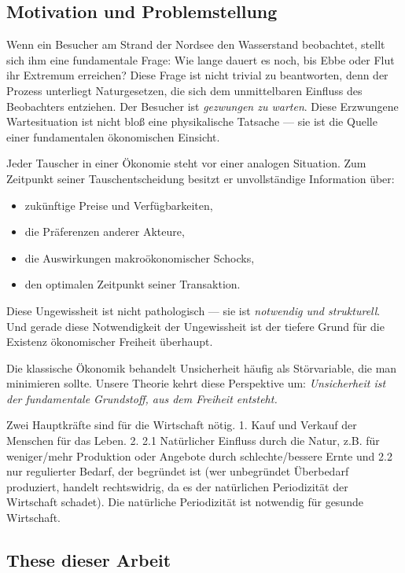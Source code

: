 \documentclass[a4paper, 12pt, twoside, openright]{report}
\theoremstyle{definition}
\theoremstyle{definition}
\begin{document}
\subsection{Motivation und Problemstellung}

Wenn ein Besucher am Strand der Nordsee den Wasserstand beobachtet, stellt sich ihm eine fundamentale Frage: Wie lange dauert es noch, bis Ebbe oder Flut ihr Extremum erreichen? Diese Frage ist nicht trivial zu beantworten, denn der Prozess unterliegt Naturgesetzen, die sich dem unmittelbaren Einfluss des Beobachters entziehen. Der Besucher ist \emph{gezwungen zu warten}. Diese Erzwungene Wartesituation ist nicht bloß eine physikalische Tatsache --- sie ist die Quelle einer fundamentalen ökonomischen Einsicht.

Jeder Tauscher in einer Ökonomie steht vor einer analogen Situation. Zum Zeitpunkt seiner Tauschentscheidung besitzt er unvollständige Information über:
\begin{itemize}
    \item zukünftige Preise und Verfügbarkeiten,
    \item die Präferenzen anderer Akteure,
    \item die Auswirkungen makroökonomischer Schocks,
    \item den optimalen Zeitpunkt seiner Transaktion.
\end{itemize}

Diese Ungewissheit ist nicht pathologisch --- sie ist \emph{notwendig und strukturell}. Und gerade diese Notwendigkeit der Ungewissheit ist der tiefere Grund für die Existenz ökonomischer Freiheit überhaupt.

Die klassische Ökonomik behandelt Unsicherheit häufig als Störvariable, die man minimieren sollte. Unsere Theorie kehrt diese Perspektive um: \emph{Unsicherheit ist der fundamentale Grundstoff, aus dem Freiheit entsteht.}

Zwei Hauptkräfte sind für die Wirtschaft nötig. 1. Kauf und Verkauf der Menschen für das Leben. 2. 2.1 Natürlicher Einfluss durch die Natur, z.B. für weniger/mehr Produktion oder Angebote durch schlechte/bessere Ernte und 2.2 nur regulierter Bedarf, der begründet ist (wer unbegründet Überbedarf produziert, handelt rechtswidrig, da es der natürlichen Periodizität der Wirtschaft schadet). Die natürliche Periodizität ist notwendig für gesunde Wirtschaft.

\subsection{These dieser Arbeit}
\end{document}
